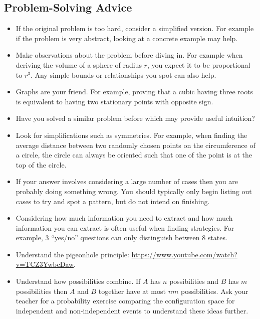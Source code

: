 \subsection*{Problem-Solving Advice}

\begin{itemize}
	\item If the original problem is too hard, consider a simplified version. For example if the problem is very abstract, looking at a concrete example may help.
	\item Make observations about the problem before diving in. For example when deriving the volume of a sphere of radius $r$, you expect it to be proportional to $r^3$. Any simple bounds or relationships you spot can also help.
	\item Graphs are your friend. For example, proving that a cubic having three roots is equivalent to having two stationary points with opposite sign.
	\item Have you solved a similar problem before which may provide useful intuition?
	\item Look for simplifications such as symmetries. For example, when finding the average distance between two randomly chosen points on the circumference of a circle, the circle can always be oriented such that one of the point is at the top of the circle.
	\item If your answer involves considering a large number of cases then you are probably doing something wrong. You should typically only begin listing out cases to try and spot a pattern, but do not intend on finishing.
	\item Considering how much information you need to extract and how much information you can extract is often useful when finding strategies. For example, 3 “yes/no” questions can only distinguish between 8 states.
	\item Understand the pigeonhole principle: \url{https://www.youtube.com/watch?v=TCZ3YwbcDaw}.
	\item Understand how possibilities combine. If $A$ has $n$ possibilities and $B$ has $m$ possibilities then $A$ and $B$ together have at most $nm$ possibilities. Ask your teacher for a probability exercise comparing the configuration space for independent and non-independent events to understand these ideas further.
\end{itemize}
